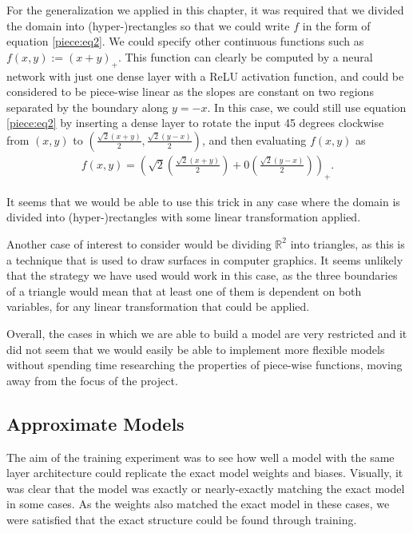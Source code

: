 \documentclass{somasmsc}
\begin{document}
For the generalization we applied in this chapter, it was required that we divided the domain into (hyper-)rectangles so that we could write $f$ in the form of equation \ref{piece:eq2}. We could specify other continuous functions such as $f(x, y) := \left(x + y\right)_+$. This function can clearly be computed by a neural network with just one dense layer with a ReLU activation function, and could be considered to be piece-wise linear as the slopes are constant on two regions separated by the boundary along $y = -x$. In this case, we could still use equation \ref{piece:eq2} by inserting a dense layer to rotate the input 45 degrees clockwise from $\left(x, y\right)$ to $\left(\frac{\sqrt{2}\left(x+y\right)}{2}, \frac{\sqrt{2}\left(y-x\right)}{2}\right)$, and then evaluating $f(x,y)$ as
\begin{align*}
    f(x,y) = \left(\sqrt{2}\left(\frac{\sqrt{2}\left(x+y\right)}{2}\right) + 0 \left(\frac{\sqrt{2}\left(y-x\right)}{2}\right)\right)_+.
\end{align*}

It seems that we would be able to use this trick in any case where the domain is divided into (hyper-)rectangles with some linear transformation applied.

Another case of interest to consider would be dividing $\mathbb{R}^2$ into triangles, as this is a technique that is used to draw surfaces in computer graphics. It seems unlikely that the strategy we have used would work in this case, as the three boundaries of a triangle would mean that at least one of them is dependent on both variables, for any linear transformation that could be applied.

Overall, the cases in which we are able to build a model are very restricted and it did not seem that we would easily be able to implement more flexible models without spending time researching the properties of piece-wise functions, moving away from the focus of the project.

\subsection{Approximate Models}

The aim of the training experiment was to see how well a model with the same layer architecture could replicate the exact model weights and biases. Visually, it was clear that the model was exactly or nearly-exactly matching the exact model in some cases. As the weights also matched the exact model in these cases, we were satisfied that the exact structure could be found through training.
\end{document}
